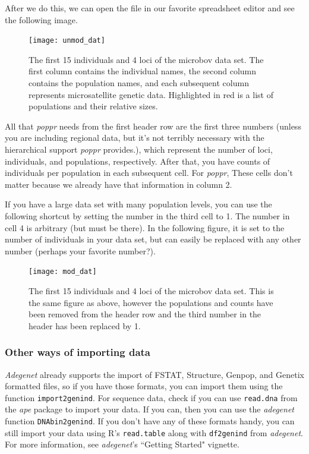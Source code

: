 \documentclass[letterpaper]{article}\usepackage[]{graphicx}\usepackage[]{color}
\newcommand{\tab}{\hspace*{1em}}
\newcommand{\poppr}{\textit{poppr}}
\newcommand{\adegenet}{\textit{adegenet}}
\newcommand{\Adegenet}{\textit{Adegenet}}
\begin{document}
After we do this, we can open the file in our favorite spreadsheet editor and see the following image.


\begin{figure}[h!]
  \centering
  \caption{\footnotesize \footnotesize The first 15 individuals and 4 loci of the microbov data set. The first column contains the individual names, the second column contains the population names, and each subsequent column represents microsatellite genetic data. Highlighted in red is a list of populations and their relative sizes.}
  \label{microbov unmodified}
\texttt{[image: unmod\_dat]}
\end{figure}

\newpage
All that \poppr{} needs from the first header row are the first three numbers (unless you are including regional data, but it's not terribly necessary with the hierarchical support \poppr{} provides.), which represent the number of loci, individuals, and populations, respectively. After that, you have counts of individuals per population in each subsequent cell. For \poppr{}, These cells don't matter because we already have that information in column 2.

If you have a large data set with many population levels, you can use the following shortcut by setting the number in the third cell to 1. The number in cell 4 is arbitrary (but must be there). In the following figure, it is set to the number of individuals in your data set, but can easily be replaced with any other number (perhaps your favorite number?). 

\begin{figure}[h!]
  \centering
  \caption{\footnotesize \footnotesize The first 15 individuals and 4 loci of the microbov data set. This is the same figure as above, however the populations and counts have been removed from the header row and the third number in the header has been replaced by 1.}
\texttt{[image: mod\_dat]}
\end{figure}


\subsubsection{Other ways of importing data}
\label{intro:import:other}

\tab\tab \Adegenet{} already supports the import of FSTAT, Structure, Genpop, and Genetix formatted files, so if you have those formats, you can import them using the function \texttt{import2genind}. For sequence data, check if you can use \texttt{read.dna} from the \textit{ape} package to import your data. If you can, then you can use the \adegenet{} function \texttt{DNAbin2genind}. If you don't have any of these formats handy, you can still import your data using R's \texttt{read.table} along with \texttt{df2genind} from \adegenet{}. For more information, see \adegenet{}'s ``Getting Started" vignette.
\end{document}
